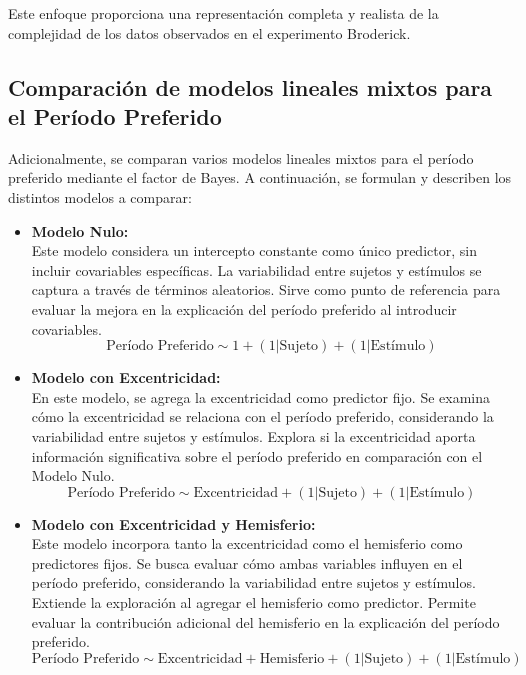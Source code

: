 Este enfoque proporciona una representación completa y realista de la complejidad de los datos observados en el experimento Broderick.

\subsection{Comparaci\'on de modelos lineales mixtos para el Período Preferido} \label{compare_mlm}

Adicionalmente, se comparan varios modelos lineales mixtos para el período preferido mediante el factor de Bayes. A continuación, se formulan y describen los distintos modelos a comparar:

\begin{itemize}
	\item \textbf{Modelo Nulo:}	\\
	Este modelo considera un intercepto constante como único predictor, sin incluir covariables específicas. La variabilidad entre sujetos y estímulos se captura a través de términos aleatorios. Sirve como punto de referencia para evaluar la mejora en la explicación del período preferido al introducir covariables.
	\begin{equation}
		\text{Período Preferido} \sim 1 + (1|\text{Sujeto}) + (1|\text{Estímulo})	
		\label{m_1}
	\end{equation}

	\item\textbf{Modelo con Excentricidad:}\\
	En este modelo, se agrega la excentricidad como predictor fijo. Se examina cómo la excentricidad se relaciona con el período preferido, considerando la variabilidad entre sujetos y estímulos. Explora si la excentricidad aporta información significativa sobre el período preferido en comparación con el Modelo Nulo.
	\begin{equation}
		\text{Período Preferido} \sim \text{Excentricidad} + (1|\text{Sujeto}) + (1|\text{Estímulo})	
		\label{m_2}
	\end{equation}

	\item \textbf{Modelo con Excentricidad y Hemisferio:}\\
	Este modelo incorpora tanto la excentricidad como el hemisferio como predictores fijos. Se busca evaluar cómo ambas variables influyen en el período preferido, considerando la variabilidad entre sujetos y estímulos. Extiende la exploración al agregar el hemisferio como predictor. Permite evaluar la contribución adicional del hemisferio en la explicación del período preferido.
	\begin{equation}
		\text{Período Preferido} \sim \text{Excentricidad} + \text{Hemisferio} + (1|\text{Sujeto}) + (1|\text{Estímulo})	
		\label{m_3}
	\end{equation}
	
\end{itemize}

